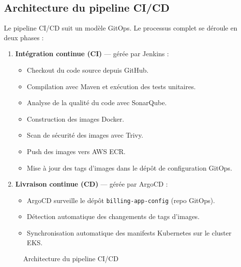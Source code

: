 \subsection{Architecture du pipeline CI/CD}

Le pipeline CI/CD suit un modèle GitOps. Le processus complet se déroule en deux phases :

\begin{enumerate}
    \item \textbf{Intégration continue (CI)} --- gérée par Jenkins :
    \begin{itemize}
        \item Checkout du code source depuis GitHub.
        \item Compilation avec Maven et exécution des tests unitaires.
        \item Analyse de la qualité du code avec SonarQube.
        \item Construction des images Docker.
        \item Scan de sécurité des images avec Trivy.
        \item Push des images vers AWS ECR.
        \item Mise à jour des tags d'images dans le dépôt de configuration GitOps.
    \end{itemize}
    \item \textbf{Livraison continue (CD)} --- gérée par ArgoCD :
    \begin{itemize}
        \item ArgoCD surveille le dépôt \texttt{billing-app-config} (repo GitOps).
        \item Détection automatique des changements de tags d'images.
        \item Synchronisation automatique des manifests Kubernetes sur le cluster EKS.
    \end{itemize}
\end{enumerate}

\begin{figure}[H]
    \centering
    \caption{Architecture du pipeline CI/CD}
    \label{fig:cicd_pipeline}
\end{figure}

